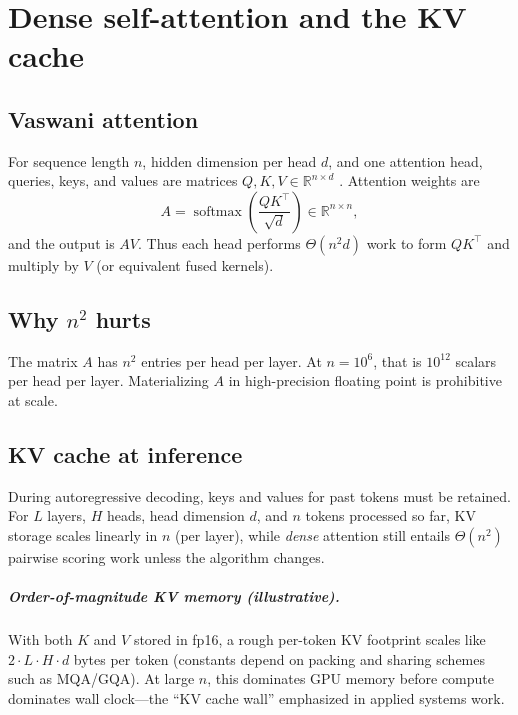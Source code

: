 \chapter{Dense self-attention and the KV cache}
\label{sec:quadratic}

\section{Vaswani attention}

For sequence length $n$, hidden dimension per head $d$, and one attention head, queries, keys, and values
are matrices $Q,K,V \in \mathbb{R}^{n\times d}$ \cite{vaswani2017attention}. Attention weights are
\begin{equation}
  A = \operatorname{softmax}\!\left(\frac{Q K^\top}{\sqrt{d}}\right) \in \mathbb{R}^{n\times n},
\end{equation}
and the output is $A V$. Thus each head performs $\Theta(n^2 d)$ work to form $QK^\top$ and multiply by $V$
(or equivalent fused kernels).

\section{Why \texorpdfstring{$n^2$}{n\textsuperscript{2}} hurts}

The matrix $A$ has $n^2$ entries per head per layer. At $n = 10^6$, that is $10^{12}$ scalars per head per layer.
Materializing $A$ in high-precision floating point is prohibitive at scale.

\section{KV cache at inference}

During autoregressive decoding, keys and values for past tokens must be retained. For $L$ layers,
$H$ heads, head dimension $d$, and $n$ tokens processed so far, KV storage scales linearly in $n$
(per layer), while \emph{dense} attention still entails $\Theta(n^2)$ pairwise scoring work unless the
algorithm changes.

\paragraph{Order-of-magnitude KV memory (illustrative).}
With both $K$ and $V$ stored in fp16, a rough per-token KV footprint scales like
$2 \cdot L \cdot H \cdot d$ bytes per token (constants depend on packing and sharing schemes such as MQA/GQA).
At large $n$, this dominates GPU memory before compute dominates wall clock---the ``KV cache wall'' emphasized
in applied systems work.

